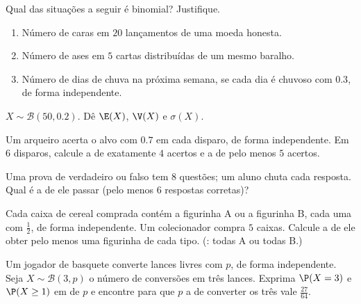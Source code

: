 \begin{exercise}[$\star$]\label{exo:g11:binom:3}
Qual das situações a seguir é binomial? Justifique.
\begin{enumerate}
  \item Número de caras em $20$ lançamentos de uma moeda honesta.
  \item Número de ases em $5$ cartas distribuídas de um mesmo baralho.
  \item Número de dias de chuva na próxima semana, se cada dia é chuvoso
        com  $0.3$, de forma independente.
\end{enumerate}
\end{exercise}

\begin{exercise}[$\star$]\label{exo:g11:binom:4}
$X \sim \mathcal B(50, 0.2)$. Dê $\E(X)$, $\V(X)$ e $\sigma(X)$.
\end{exercise}

\begin{exercise}[$\star\star$]\label{exo:g11:binom:5}
Um arqueiro acerta o alvo com  $0.7$ em cada disparo, de
forma independente. Em $6$ disparos, calcule a  de
exatamente $4$ acertos e a de pelo menos $5$ acertos.
\end{exercise}

\begin{exercise}[$\star\star$]\label{exo:g11:binom:6}
Uma prova de verdadeiro ou falso tem $8$ questões; um aluno chuta cada
resposta. Qual é a  de ele passar (pelo menos $6$ respostas
corretas)?
\end{exercise}

\begin{exercise}[$\star\star$]\label{exo:g11:binom:7}
Cada caixa de cereal comprada contém a figurinha A ou a figurinha B, cada
uma com  $\frac12$, de forma independente. Um colecionador
compra $5$ caixas. Calcule a  de ele obter pelo menos uma
figurinha de cada tipo. (: todas A ou todas B.)
\end{exercise}

\begin{exercise}[$\star\star$]\label{exo:g11:binom:8}
Um jogador de basquete converte lances livres com  $p$, de
forma independente. Seja $X \sim \mathcal B(3, p)$ o número de conversões
em três lances. Exprima $\P(X = 3)$ e $\P(X \geq 1)$ em  de $p$ e
encontre para que $p$ a  de converter os três vale
$\frac{27}{64}$.
\end{exercise}

